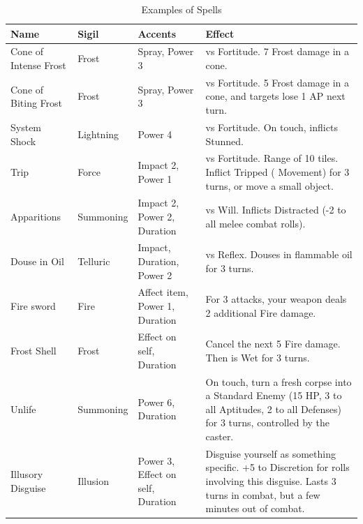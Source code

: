 \begin{table}[h!tbp]
	\begin{center}
		\begin{tabular}{p{2.5cm}p{2cm}p{3.5cm}p{7.5cm}} \toprule
			
		    \textbf{Name} & \textbf{Sigil} & \textbf{Accents} & \textbf{Effect} \\ \midrule

		    Cone of Intense Frost & Frost & Spray, Power 3 & vs Fortitude. 7 Frost damage in a cone. \\[2mm] 
            Cone of Biting Frost & Frost & Spray, Power 3 & vs Fortitude. 5 Frost damage in a cone, and targets lose 1 AP next turn. \\[2mm] 

            System Shock & Lightning & Power 4 & vs Fortitude. On touch, inflicts Stunned. \\[2mm] 

            Trip & Force & Impact 2, Power 1 & vs Fortitude. Range of 10 tiles. Inflict Tripped (\times 0.5 Movement) for 3 turns, or move a small object. \\[2mm] 

            Apparitions & Summoning & Impact 2, Power 2, Duration & vs Will. Inflicts Distracted (-2 to all melee combat rolls). \\[2mm] 

            Douse in Oil & Telluric & Impact, Duration, Power 2 & vs Reflex. Douses in flammable oil for 3 turns.  \\[2mm] 

            Fire sword	& Fire	& Affect item, Power 1, Duration & For 3 attacks, your weapon deals 2 additional Fire damage. \\[2mm] 

            Frost Shell & Frost & Effect on self, Duration & Cancel the next 5 Fire damage. Then is Wet for 3 turns. \\[2mm] 

            Unlife  & Summoning & Power 6, Duration & On touch, turn a fresh corpse into a Standard Enemy (15 HP, 3 to all Aptitudes, 2 to all Defenses) for 3 turns, controlled by the caster. \\[2mm]

            Illusory Disguise & Illusion & Power 3, Effect on self, Duration & Disguise yourself as something specific. +5 to Discretion for rolls involving this disguise. Lasts 3 turns in combat, but a few minutes out of combat. \\[2mm] 

		    \bottomrule
		\end{tabular}
	\end{center}
	\caption{Examples of Spells}
  \label{spells_example_table}
\end{table}



